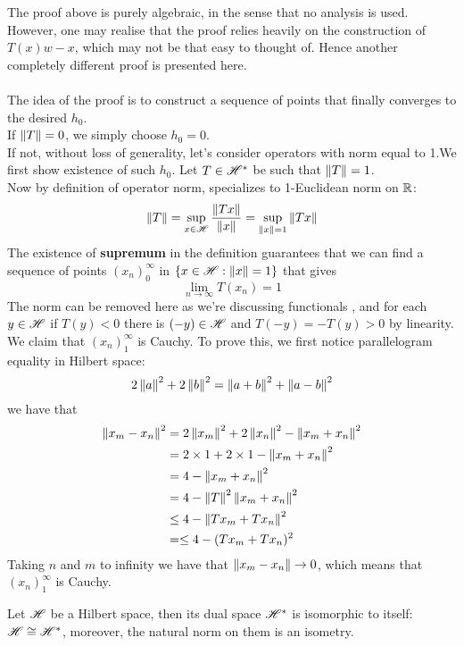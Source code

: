 \begin{remark}\rm\nextline
	The proof above is purely algebraic, in the sense that no analysis is used. However, one may realise that the proof relies heavily on the construction of $T(x)w-x$, which may not be that easy to thought of. Hence another completely different proof is presented here. \\
	\pf\\
	The idea of the proof is to construct a sequence of points that finally converges to the desired $h_0$.\\
	If $\left\|{T}\right\|=0$, we simply choose $h_0=0$.\\
	If not, without loss of generality, let's consider operators with norm equal to 1.We first show existence of such $h_0$. Let $T\in\mathscr{H}^*$ be such that $\left\|{T}\right\|=1$.\\
	Now by definition of operator norm, specializes to 1-Euclidean norm on $\mathbb{R}$:
	$$
		\left\|{T}\right\|=\sup_{x\in\mathscr{H}}\frac{\left\|{Tx}\right\|}{\left\|{x}\right\|} =\sup_{\left\|{x}\right\|=1}\left\|{Tx}\right\|
	$$
	The existence of {\bf supremum} in the definition guarantees that we can find a sequence of points $(x_n)_0^\infty$ in $\{x\in\mathscr{H}:\left\|{x}\right\|=1\}$ that gives
	$$
		\lim_{n\to\infty}{T(x_n)}=1
	$$
	The norm can be removed here as we're discussing functionals , and for each $y\in\mathscr{H}$ if $T(y)<0$ there is $(-y)\in\mathscr{H}$ and $T(-y)=-T(y)>0$ by linearity.\\
	We claim that $(x_n)_1^\infty$ is Cauchy. To prove this, we first notice  parallelogram equality in Hilbert space:
	$$
		2\left\|{a}\right\|^2+2\left\|{b}\right\|^2=\left\|{a+b}\right\|^2+\left\|{a-b}\right\|^2
	$$
	we have that
	\begin{equation}
		\begin{split}
			\left\|{x_m-x_n}\right\|^2&=2\left\|{x_m}\right\|^2+2\left\|{x_n}\right\|^2-\left\|{x_m+x_n}\right\|^2\\
			&=2\times1+2\times1-\left\|{x_m+x_n}\right\|^2\\
			&=4-\left\|{x_m+x_n}\right\|^2\\
			&=4-\left\|{T}\right\|^2\left\|{x_m+x_n}\right\|^2\\
			&\leq4-\left\|{Tx_m+Tx_n}\right\|^2\\
			&=\leq4-(Tx_m+Tx_n)^2
		\end{split}
	\end{equation}
	Taking $n$ and $m$ to infinity we have that $\left\|{x_m-x_n}\right\|\to 0$, which means that $(x_n)_1^\infty$ is Cauchy.
\end{remark}
\begin{theorem}\label{dual space Hilbert}\rm\nextline
	Let $\mathscr{H}$ be a Hilbert space, then its dual space $\mathscr{H}^*$ is isomorphic to  itself: $\mathscr{H}\cong\mathscr{H}^*$, moreover, the natural norm on them is an isometry.\placeholder
\end{theorem}

